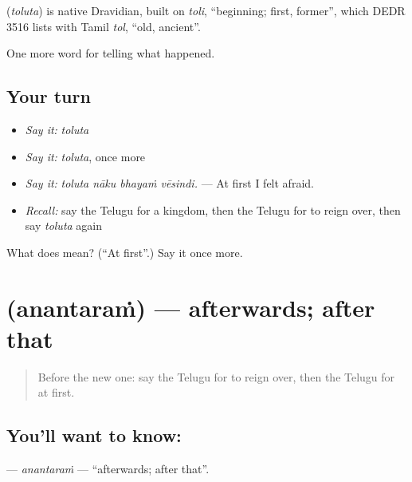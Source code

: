 \begin{cousinweb}
\textbf{} (\emph{toluta}) is native Dravidian, built on \emph{toli}, \textquotedblleft{}beginning; first, former\textquotedblright{}, which DEDR 3516 lists with Tamil \emph{tol}, \textquotedblleft{}old, ancient\textquotedblright{}.
\end{cousinweb}

\begin{grammarlens}[title={What you've built}]
One more word for telling what happened.
\end{grammarlens}

\subsection*{Your turn}
\begin{itemize}
\raggedright
  \item \emph{Say it:} \emph{toluta}
  \item \emph{Say it:} \emph{toluta}, once more
  \item \emph{Say it:} \emph{toluta nāku bhayaṁ vēsindi.} — At first I felt afraid.
  \item \emph{Recall:} say the Telugu for a kingdom, then the Telugu for to reign over, then say \emph{toluta} again
\end{itemize}

\begin{tcolorbox}[breakable,colback=teal!4,colframe=teal!35!black,title={Before you move on}]
What does  mean? (\textquotedblleft{}At first\textquotedblright{}.) Say it once more.
\end{tcolorbox}
\section[\texorpdfstring{\te{అనంతరం} (anantaraṁ)}{అనంతరం (anantaraṁ)}]{ (anantaraṁ) — afterwards; after that}

\label{lesson:TE-C328-anantaram}



\begin{quote}
Before the new one: say the Telugu for to reign over, then the Telugu for at first.
\end{quote}

\subsection*{You'll want to know: }
\textbf{} — \emph{anantaraṁ} — \textquotedblleft{}afterwards; after that\textquotedblright{}.

